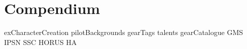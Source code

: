 \chapter{Compendium}

{exCharacterCreation}
{pilotBackgrounds}
{gearTags}
{talents}
{gearCatalogue}
{GMS}
{IPSN}
{SSC}
{HORUS}
{HA}